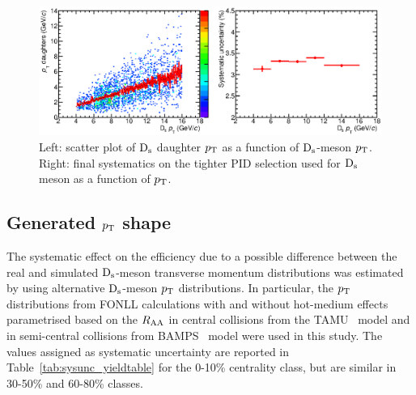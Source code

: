 \begin{figure}[!h]
 \centering
 \includegraphics[angle=0, width=13cm]{./FigCap5/PIDsystDs_MCall.eps}
 \caption{Left: scatter plot of ${\rm D_s}$ daughter $p_{\rm T}$ as a function of ${\rm D_s}$-meson $p_{\rm T}$. Right: final systematics on the tighter PID selection used for ${\rm D_s}$ meson as a function of $p_{\rm T}$.}
 \label{fig:DsPIDsys} 
\end{figure}

\subsection{Generated $p_{\rm T}$ shape}
The systematic effect on the efficiency due to a possible difference between 
the real and simulated ${\rm D_s}$-meson transverse momentum distributions
was estimated by using alternative ${\rm D_s}$-meson $p_{\rm T}$ distributions.
In particular, the $p_{\rm T}$ distributions from FONLL calculations with
and without hot-medium effects parametrised based on the $R_{\rm AA}$ in central collisions from the 
TAMU~\cite{He:2014cla} model and in semi-central collisions from 
BAMPS~\cite{Uphoff:2014hza} model were used in this study.
The values assigned as systematic uncertainty are reported in 
Table~\ref{tab:sysunc_yieldtable} for the 0-10\% centrality class, but are similar in 
30-50\% and 60-80\% classes. 

